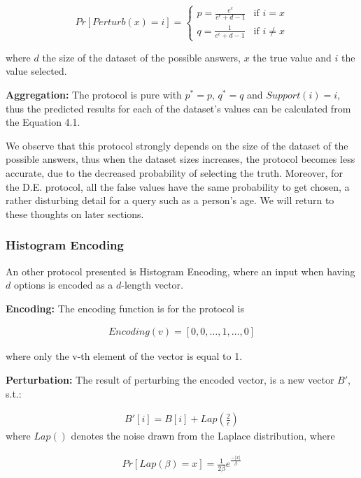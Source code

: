 \begin{equation*}
    Pr[Perturb(x) = i] =
	\begin{cases}
    	p = \frac{e^\epsilon}{e^\epsilon + d - 1} & \mbox{if } i = x \\
    	q = \frac{1}{e^\epsilon + d - 1} & \mbox{if } i \neq x 
	\end{cases}
\end{equation*}

where $d$ the size of the dataset of the possible answers, $x$ the true value and $i$ the value selected.

\textbf{Aggregation:} The protocol is pure with $p^* = p$, $q^* = q$ and $Support(i) = i$, thus the predicted results for each of the dataset's values can be calculated from the Equation 4.1.

We observe that this protocol strongly depends on the size of the dataset of the possible answers, thus when the dataset sizes increases, the protocol becomes less accurate, due to the decreased probability of selecting the truth. Moreover, for the D.E. protocol, all the false values have the same probability to get chosen, a rather disturbing detail for a query such as a person's age. We will return to these thoughts on later sections.

\subsubsection{Histogram Encoding}

An other protocol presented is Histogram Encoding, where an input when having $d$ options is encoded as a $d$-length vector.

\textbf{Encoding:} The encoding function is for the protocol is

\begin{align*}
    Encoding(v) = [0, 0, \dots, 1, \dots, 0]
\end{align*}

where only the v-th element of the vector is equal to 1.

\textbf{Perturbation:} The result of perturbing the encoded vector, is a new vector $B'$, s.t.: 

\begin{align*}
    B'[i] = B[i] + Lap(\frac{2}{\epsilon})
\end{align*}
where $Lap()$ denotes the noise drawn from the Laplace distribution, where


\begin{align*}
    Pr[Lap(\beta) = x] = \frac{1}{2\beta}e^{\frac{-|x|}{\beta}}
\end{align*}

